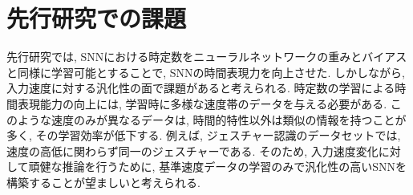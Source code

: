 \section{先行研究での課題}
先行研究では, SNNにおける時定数をニューラルネットワークの重みとバイアスと同様に学習可能とすることで, SNNの時間表現力を向上させた.
しかしながら, 入力速度に対する汎化性の面で課題があると考えられる.
時定数の学習による時間表現能力の向上には, 学習時に多様な速度帯のデータを与える必要がある.
このような速度のみが異なるデータは, 時間的特性以外は類似の情報を持つことが多く, その学習効率が低下する.
例えば, ジェスチャー認識のデータセットでは, 速度の高低に関わらず同一のジェスチャーである.
そのため, 入力速度変化に対して頑健な推論を行うために, 基準速度データの学習のみで汎化性の高いSNNを構築することが望ましいと考えられる.
